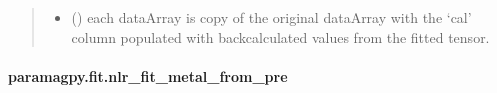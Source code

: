 \documentclass[a4paper,10pt,english,openany,oneside]{sphinxmanual}
\begin{document}
\begin{fulllineitems}
\begin{quote}
\begin{description}
\begin{itemize}
\item {} 
\sphinxAtStartPar
{} () \textendash{} each dataArray is copy of the original dataArray with
the ‘cal’ column populated with back\sphinxhyphen{}calculated values from the
fitted tensor.

\end{itemize}


\end{description}\end{quote}

\end{fulllineitems}



\paragraph{paramagpy.fit.nlr\_fit\_metal\_from\_pre}
\label{\detokenize{reference/generated/paramagpy.fit.nlr_fit_metal_from_pre:paramagpy-fit-nlr-fit-metal-from-pre}}\label{\detokenize{reference/generated/paramagpy.fit.nlr_fit_metal_from_pre::doc}}
\end{document}
